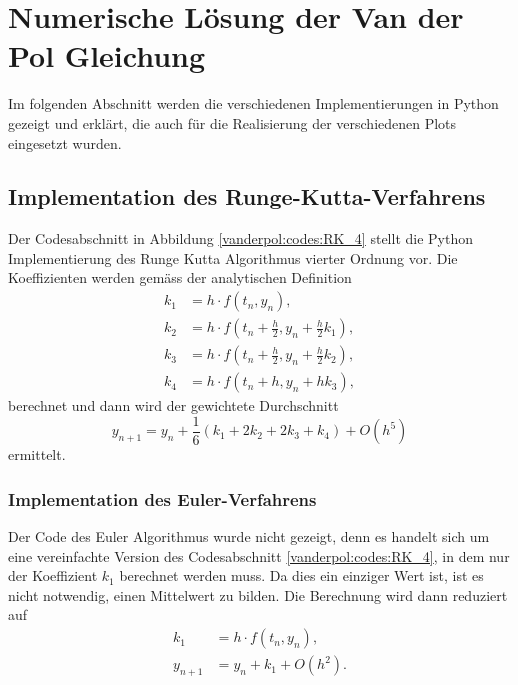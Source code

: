 %
%
%
\section{Numerische Lösung der Van der Pol Gleichung
\label{vanderpol:section:loesung}}
Im folgenden Abschnitt werden die verschiedenen Implementierungen in Python gezeigt und erklärt, die auch für die Realisierung der verschiedenen Plots eingesetzt wurden.

\subsection{Implementation des Runge-Kutta-Verfahrens
\label{vanderpol:subsection:rk}}
Der Codesabschnitt in Abbildung \ref{vanderpol:codes:RK_4} stellt die Python Implementierung des Runge Kutta Algorithmus vierter Ordnung vor. Die Koeffizienten werden gemäss der analytischen Definition
\begin{align*}
k_1 &= h \cdot f(t_n, y_n),\\
k_2 &= h \cdot f\left(t_n + \frac{h}{2}, y_n + \frac{h}{2} k_1\right), \\
k_3 &= h \cdot f\left(t_n + \frac{h}{2}, y_n + \frac{h}{2} k_2\right), \\
k_4 &= h \cdot f(t_n + h, y_n + h k_3),
\end{align*}
berechnet und dann wird der gewichtete Durchschnitt
\begin{equation}
y_{n+1} = y_n + \frac{1}{6}(k_1 + 2k_2 + 2k_3 + k_4) +O(h^5)
\end{equation}
ermittelt.
\subsubsection{Implementation des Euler-Verfahrens
\label{vanderpol:subsubsection:euler}}
Der Code des Euler Algorithmus wurde nicht gezeigt, denn es handelt sich um eine vereinfachte Version des Codesabschnitt \ref{vanderpol:codes:RK_4}, in dem nur der Koeffizient $k_1$ berechnet werden muss. Da dies ein einziger Wert ist, ist es nicht notwendig, einen Mittelwert zu bilden. Die Berechnung wird dann reduziert auf
\begin{align*}
k_1 &= h \cdot f(t_n, y_n), \\
y_{n+1} &= y_n + k_1 +O(h^2).
\end{align*}


